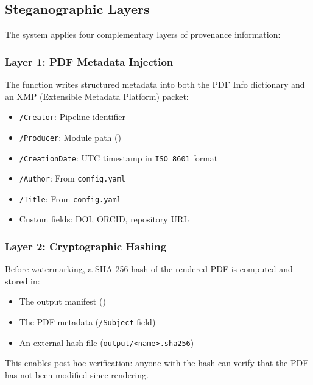 \documentclass[
  english,
]{article}
\providecommand{\tightlist}{%
  \setlength{\itemsep}{0pt}\setlength{\parskip}{0pt}}
\begin{document}
\subsection{Steganographic Layers}\label{steganographic-layers}

The system applies four complementary layers of provenance information:

\subsubsection{Layer 1: PDF Metadata
Injection}\label{layer-1-pdf-metadata-injection}

The  function writes structured metadata
into both the PDF Info dictionary and an XMP (Extensible Metadata
Platform) packet:

\begin{itemize}
\tightlist
\item
  \texttt{/Creator}: Pipeline identifier
\item
  \texttt{/Producer}: Module path
  ()
\item
  \texttt{/CreationDate}: UTC timestamp in \texttt{ISO\ 8601} format
\item
  \texttt{/Author}: From \texttt{config.yaml}
\item
  \texttt{/Title}: From \texttt{config.yaml}
\item
  Custom fields: DOI, ORCID, repository URL
\end{itemize}

\subsubsection{Layer 2: Cryptographic
Hashing}\label{layer-2-cryptographic-hashing}

Before watermarking, a SHA-256 hash of the rendered PDF is computed and
stored in:

\begin{itemize}
\tightlist
\item
  The output manifest ()
\item
  The PDF metadata (\texttt{/Subject} field)
\item
  An external hash file
  (\texttt{output/\textless{}name\textgreater{}.sha256})
\end{itemize}

This enables post-hoc verification: anyone with the hash can verify that
the PDF has not been modified since rendering.
\end{document}
